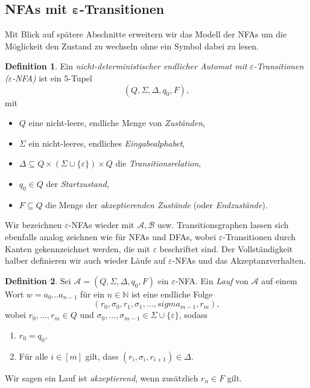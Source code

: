\documentclass[11pt, a4paper]{article}
\theoremstyle{definition}
\newtheorem{definition}{Definition}[section]
\theoremstyle{plain}
\numberwithin{equation}{section}
\begin{document}
\subsection[NFAs mit $\varepsilon$-Transitionen]{NFAs mit $\bm{\varepsilon}$-Transitionen}
Mit Blick auf spätere Abschnitte erweitern wir das Modell der NFAs um die Möglickeit den Zustand zu wechseln ohne ein Symbol dabei zu lesen.
\begin{definition}
	Ein \textit{nicht-deterministischer endlicher Automat mit} \textit{$\varepsilon$-Transitionen ($\varepsilon$-NFA)} ist ein 5-Tupel
	$$
		(Q, \Sigma, \Delta, q_0, F),
	$$
	mit
	\begin{itemize}
		\item $Q$ eine nicht-leere, endliche Menge von \textit{Zuständen},
		\item $\Sigma$ ein nicht-leeres, endliches \textit{Eingabealphabet},
		\item $\Delta \subseteq Q \times (\Sigma \cup \{\varepsilon\}) \times Q$ die \textit{Transitionsrelation},
		\item $q_0 \in Q$ der \textit{Startzustand},
		\item $F \subseteq Q$ die Menge der \textit{akzeptierenden Zustände} (oder \textit{Endzustände}).
	\end{itemize}
\end{definition}
Wir bezeichnen $\varepsilon$-NFAs wieder mit $\mathcal{A}, \mathcal{B}$ usw. Transitionsgraphen lassen sich ebenfalls analog zeichnen wie für NFAs und DFAs, wobei $\varepsilon$-Transitionen durch Kanten gekennzeichnet werden, die mit $\varepsilon$ beschriftet sind. Der Voll\-stän\-dig\-keit halber definieren wir auch wieder Läufe auf $\varepsilon$-NFAs und das Akzeptanzverhalten.
\begin{definition}
	Sei $\mathcal{A} = (Q, \Sigma, \Delta, q_0, F)$ ein $\varepsilon$-NFA.
	Ein \textit{Lauf} von $\mathcal{A}$ auf einem Wort $w = a_0 \ldots a_{n-1}$ für ein $n \in \mathbb{N}$ ist eine endliche Folge
	$$
		(r_0, \sigma_0, r_1, \sigma_1, \ldots, sigma_{m-1}, r_m),
	$$
	wobei $r_0, \ldots, r_m \in Q$ und $\sigma_0, \ldots, \sigma_{m-1} \in \Sigma \cup \{\varepsilon\}$, sodass
	\begin{enumerate}
		\item $r_0 = q_0$,
		\item Für alle $i \in [m]$ gilt, dass $(r_i, \sigma_i, r_{i+1}) \in \Delta$.
	\end{enumerate}
	Wir sagen ein Lauf ist \textit{akzeptierend}, wenn zusätzlich $r_n \in F$ gilt.
\end{definition}
\end{document}
